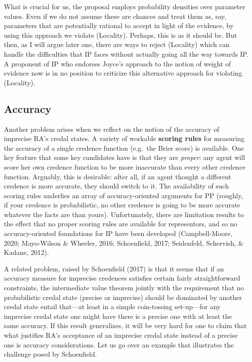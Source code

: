 \documentclass[
  10pt,
  dvipsnames,enabledeprecatedfontcommands]{scrartcl}
\begin{document}
What is crucial for us, the proposal employs probability densities over
parameter values. Even if we do not assume these are chances and treat
them as, say, parameters that are potentially rational to accept in
light of the evidence, by using this approach we violate (Locality).
Perhaps, this is as it should be. But then, as I will argue later one,
there are ways to reject (Locality) which can handle the difficulties
that IP faces without actually going all the way towards IP. A proponent
of IP who endorses Joyce's approach to the notion of weight of evidence
now is in no position to criticize this alternative approach for
violating (Locality).

\hypertarget{accuracy}{%
\subsection{Accuracy}\label{accuracy}}

Another problem arises when we reflect on the notion of the accuracy of
imprecise RA's credal states. A variety of workable
\textbf{scoring rules} for measuring the accuracy of a single credence
function (e.g.~the Brier score) is available. One key feature that some
key candidates have is that they are \emph{proper}: any agent will score
her own credence function to be more inaccurate than every other
credence function. Arguably, this is desirable: after all, if an agent
thought a different credence is more accurate, they should switch to it.
The availability of such scoring rules underlies an array of
accuracy-oriented arguments for PP (roughly, if your credence is
probabilistic, no other credence is going to be more accurate whatever
the facts are than yours). Unfortunately, there are limitation results
to the effect that no proper scoring rules are available for
representors, and so no accuracy-oriented foundations for IP have been
developed (Campbell-Moore, 2020; Mayo-Wilson \& Wheeler, 2016;
Schoenfield, 2017; Seidenfeld, Schervish, \& Kadane, 2012).

A related problem, raised by Schoenfield (2017) is that it seems that if
an accuracy measure for imprecise credences satisfies certain fairly
straightforward constraints, the intermediate value theorem jointly with
the requirement that no probabilistic credal state (precise or
imprecise) should be dominated by another credal state entail that---at
least in a simple coin-tossing set-up---for any imprecise credal state
one might have there is a precise one with at least the same accuracy.
If this result generalizes, it will be very hard for one to claim that
what justifies RA's acceptance of an imprecise credal state instead of a
precise one is accuracy considerations. Let us go over an example that
illustrates the challenge posed by Schoenfield.
\end{document}
